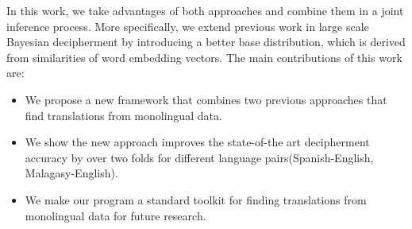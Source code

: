 In this work, we take advantages of both approaches and combine them in a joint inference process. More specifically, we extend previous work in large scale Bayesian decipherment by introducing a better base distribution, which is derived from similarities of word embedding vectors. The main contributions of this work are:

\begin{itemize}
\item We propose a new framework that combines two previous approaches that find translations from monolingual data.

\item We show the new approach improves the state-of-the art decipherment accuracy by over two folds for different language pairs(Spanish-English, Malagasy-English). 

\item We make our program a standard toolkit for finding translations from monolingual data for future research.
\end{itemize}